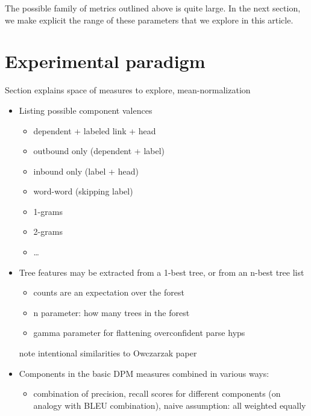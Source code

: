 \documentclass{kluwer}    %
\begin{document}
\begin{article}
The possible family of metrics outlined above is quite large. In the
next section, we make explicit the range of these parameters that we
explore in this article.


\section{Experimental paradigm}
\label{sec:paradigm}

Section explains space of measures to explore, mean-normalization

\begin{itemize}
\item Listing possible component valences
  \begin{itemize}
  \item dependent + labeled link + head 
  \item outbound only (dependent +
    label)
  \item inbound only (label + head)
  \item word-word (skipping label)
  \end{itemize}
  \begin{itemize}
  \item 1-grams
  \item 2-grams
  \item \ldots{}
  \end{itemize}
  
    
\item Tree features may be extracted from a 1-best tree, or from an
  n-best tree list 

  \begin{itemize}
  \item  counts are an expectation over the forest
  \item n parameter: how many trees in the forest
  \item gamma parameter for flattening overconfident parse hyps
  \end{itemize}
  note intentional similarities to Owczarzak paper


\item Components in the basic DPM measures combined in various ways:

  \begin{itemize}
  \item combination of precision, recall scores for different
    components (on analogy with BLEU combination), naive assumption:
    all weighted equally


\end{itemize}
\end{itemize}
\end{article}
\end{document}
